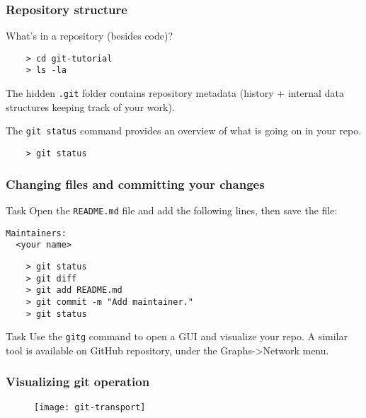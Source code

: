 
\begin{frame}[fragile]
	\frametitle{Repository structure}
	
	What's in a repository (besides code)?
	
	\begin{verbatim}
	> cd git-tutorial
	> ls -la
	\end{verbatim}
	
	The hidden \texttt{.git} folder contains repository metadata (history + internal data structures keeping track of your work).
	
	The \texttt{git status} command provides an overview of what is going on in your repo.
	\begin{verbatim}
	> git status
	\end{verbatim}
	
\end{frame}


\begin{frame}[fragile]
	\frametitle{Changing files and committing your changes}
	
	\begin{block}{Task}
	Open the \texttt{README.md} file and add the following lines, then save the file:
	\begin{verbatim}
Maintainers:
  <your name>
	\end{verbatim}
	\end{block}
	
	\begin{verbatim}
	> git status
	> git diff
	> git add README.md
	> git commit -m "Add maintainer."
	> git status
	\end{verbatim}

	\begin{block}{Task}
	Use the \texttt{gitg} command to open a GUI and visualize your repo. A similar tool is available on GitHub repository, under the Graphs->Network menu.
	\end{block}
	
\end{frame}


\begin{frame}[fragile]
	\frametitle{Visualizing git operation}
	
	\begin{figure}
		\texttt{[image: git-transport]}
	\end{figure}
\end{frame}

